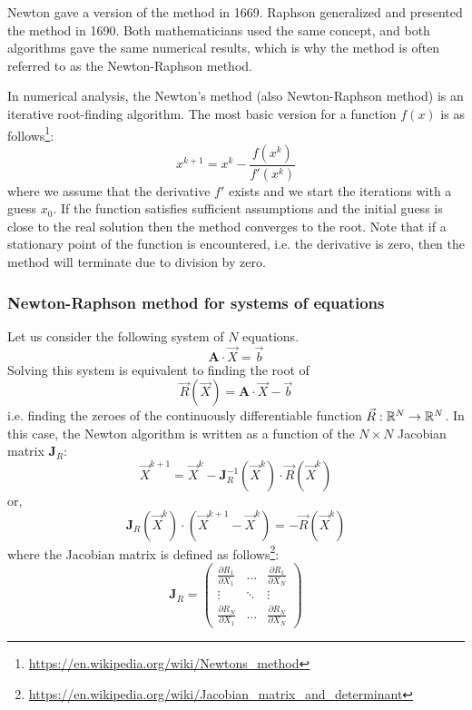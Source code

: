 Newton gave a version of the method in 1669. Raphson generalized and presented
the method in 1690. Both mathematicians used the same concept, and both algorithms gave the
same numerical results, which is why the method is often referred to as the Newton-Raphson method.


In numerical analysis, the Newton's method (also Newton-Raphson method) 
is an iterative root-finding algorithm.
The most basic version for a function $f(x)$ is as follows\footnote{\url{https://en.wikipedia.org/wiki/Newtons_method}}:
\[
x^{k+1} = x^k - \frac{f(x^k)}{f'(x^k)}
\]
where we assume that the derivative $f'$ exists and we start the iterations 
with a guess $x_0$.
If the function satisfies sufficient assumptions and the initial guess is close
to the real solution then the method converges to the root. 
Note that if a stationary point of the function is encountered, i.e. 
the derivative is zero, then the method will terminate due to division by zero. 

\subsubsection*{Newton-Raphson method for systems of equations}
Let us consider the following system of $N$ equations. 
\[
{\bm A} \cdot \vec{X} = \vec{b}
\]
Solving this system is equivalent to finding the root of 
\[
\vec{R}(\vec{X}) =  {\bm A} \cdot \vec{X} - \vec{b}
\]
i.e. finding the zeroes of the continuously differentiable function $\vec{R}: {\mathbb{R}}^N \rightarrow {\mathbb{R}}^N$. 
In this case, the Newton algorithm is written as a function of the $N\times N$ Jacobian 
matrix ${\bm J}_R$:
\begin{equation}
\vec{X}^{k+1} = \vec{X}^k - {\bm J}_R^{-1}(\vec{X}^k) \cdot {\vec R}(\vec{X}^k)
\end{equation}
or,
\begin{equation}
{\bm J}_R (\vec{X}^k) \cdot( \vec{X}^{k+1} - \vec{X}^k  )   = - \vec{R}(\vec{X}^k)
\label{eq:f87newt}
\end{equation}
where the Jacobian matrix is defined as follows\footnote{\url{https://en.wikipedia.org/wiki/Jacobian_matrix_and_determinant}}:
\[
{\bm J}_R = 
\left(
\begin{array}{ccc}
\frac{\partial R_1}{\partial X_1} & \dots & \frac{\partial R_1}{\partial X_N} \\
\vdots & \ddots & \vdots \\ 
\frac{\partial R_N}{\partial X_1} & \dots & \frac{\partial R_N}{\partial X_N} 
\end{array}
\right)
\]



